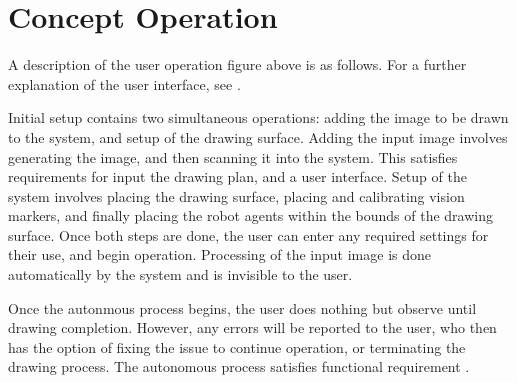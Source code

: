 
\section{Concept Operation}
\label{sec:concept_operation}



A description of the user operation figure above is as follows. For a further explanation of the user interface, see .

Initial setup contains two simultaneous operations: adding the image to be drawn to the system, and setup of the drawing surface. Adding the input image involves generating the image, and then scanning it into the system. This satisfies requirements for input the drawing plan, and a user interface. Setup of the system involves placing the drawing surface, placing and calibrating vision markers, and finally placing the robot agents within the bounds of the drawing surface. Once both steps are done, the user can enter any required settings for their use, and begin operation. Processing of the input image is done automatically by the system and is invisible to the user.

Once the autonmous process begins, the user does nothing but observe until drawing completion. However, any errors will be reported to the user, who then has the option of fixing the issue to continue operation, or terminating the drawing process. The autonomous process satisfies functional requirement .
